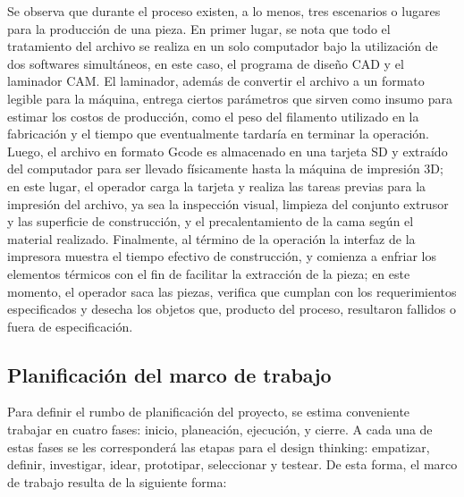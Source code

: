 Se observa que durante el proceso existen, a lo menos, tres escenarios o lugares para la producción de una pieza. En primer lugar, se nota que todo el tratamiento del archivo se realiza en un solo computador bajo la utilización de dos softwares simultáneos, en este caso, el programa de diseño CAD y el laminador CAM. El laminador, además de convertir el archivo a un formato legible para la máquina, entrega ciertos parámetros que sirven como insumo para estimar los costos de producción, como el peso del filamento utilizado en la fabricación y el tiempo que eventualmente tardaría en terminar la operación. Luego, el archivo en formato Gcode es almacenado en una tarjeta SD y extraído del computador para ser llevado físicamente hasta la máquina de impresión 3D; en este lugar, el operador carga la tarjeta y realiza las tareas previas para la impresión del archivo, ya sea la inspección visual, limpieza del conjunto extrusor y las superficie de construcción, y el precalentamiento de la cama según el material realizado. Finalmente, al término de la operación la interfaz de la impresora muestra el tiempo efectivo de construcción, y comienza a enfriar los elementos térmicos con el fin de facilitar la extracción de la pieza; en este momento, el operador saca las piezas, verifica que cumplan con los requerimientos especificados y desecha los objetos que, producto del proceso, resultaron fallidos o fuera de especificación. 

\subsection{Planificación del marco de trabajo}

Para definir el rumbo de planificación del proyecto, se estima conveniente trabajar en cuatro fases: inicio, planeación, ejecución,  y cierre. A cada una de estas fases se les corresponderá las etapas para el design thinking: empatizar, definir, investigar, idear, prototipar, seleccionar y testear. De esta forma, el marco de trabajo resulta de la siguiente forma:

